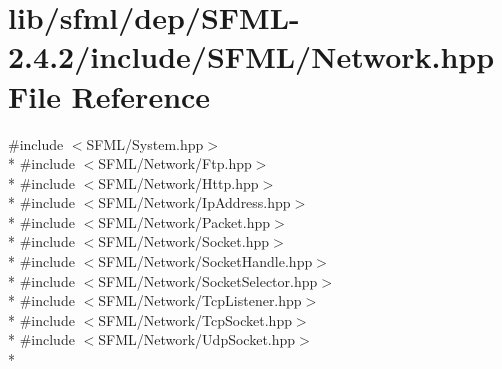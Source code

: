 \hypertarget{sfml_2dep_2_s_f_m_l-2_84_82_2include_2_s_f_m_l_2_network_8hpp}{\section{lib/sfml/dep/\-S\-F\-M\-L-\/2.4.2/include/\-S\-F\-M\-L/\-Network.hpp File Reference}
\label{sfml_2dep_2_s_f_m_l-2_84_82_2include_2_s_f_m_l_2_network_8hpp}
}
{\ttfamily \#include $<$S\-F\-M\-L/\-System.\-hpp$>$}\\*
{\ttfamily \#include $<$S\-F\-M\-L/\-Network/\-Ftp.\-hpp$>$}\\*
{\ttfamily \#include $<$S\-F\-M\-L/\-Network/\-Http.\-hpp$>$}\\*
{\ttfamily \#include $<$S\-F\-M\-L/\-Network/\-Ip\-Address.\-hpp$>$}\\*
{\ttfamily \#include $<$S\-F\-M\-L/\-Network/\-Packet.\-hpp$>$}\\*
{\ttfamily \#include $<$S\-F\-M\-L/\-Network/\-Socket.\-hpp$>$}\\*
{\ttfamily \#include $<$S\-F\-M\-L/\-Network/\-Socket\-Handle.\-hpp$>$}\\*
{\ttfamily \#include $<$S\-F\-M\-L/\-Network/\-Socket\-Selector.\-hpp$>$}\\*
{\ttfamily \#include $<$S\-F\-M\-L/\-Network/\-Tcp\-Listener.\-hpp$>$}\\*
{\ttfamily \#include $<$S\-F\-M\-L/\-Network/\-Tcp\-Socket.\-hpp$>$}\\*
{\ttfamily \#include $<$S\-F\-M\-L/\-Network/\-Udp\-Socket.\-hpp$>$}\\*
